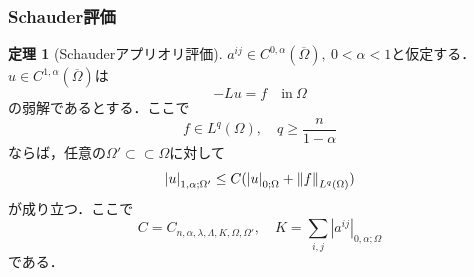 \documentclass[a4paper]{ltjsarticle}
\newcommand{\Om}{\Omega}
\newcommand{\Ombar}{\overline{\Omega}}
\newcommand{\ssubset}{\subset\subset}
\newcommand{\inn}{\quad\text{in}\ }
\newcommand{\1}{\mathbbm{1}}
\numberwithin{equation}{section}
\theoremstyle{definition}
\newtheorem{thm}{定理}[section]
\begin{document}
\subsubsection{Schauder評価}
\begin{thm}[Schauderアプリオリ評価]
    $a^{ij}\in C^{0,\alpha}(\Ombar),\ 0<\alpha<1$と仮定する．$u\in C^{1,\alpha}(\Ombar)$は
    \begin{equation}
        -Lu=f\inn\Om 
    \end{equation}
    の弱解であるとする．ここで
    \begin{equation}
        f\in L^q(\Om),\quad q\geq \frac{n}{1-\alpha}
    \end{equation}
    ならば，任意の$\Om'\ssubset \Om$に対して
    \begin{equation}
        \abs{u}_{1,\alpha;\Om'}\leq C(\abs{u}_{0;\Om}+\norm{f}_{L^q(\Om)})
    \end{equation}
    が成り立つ．ここで
    \begin{equation}
        C=C_{n,\alpha,\lambda,\Lambda,K,\Om,\Om'},\quad K=\sum_{i,j}|a^{ij}|_{0,\alpha;\Om}
    \end{equation}
    である．
\end{thm}
\end{document}
